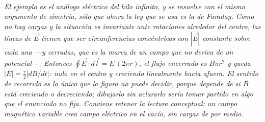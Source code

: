 \begin{center}
\begin{tikzpicture}[scale=1]
\end{tikzpicture}\\[0.5em]
{\small\itshape El ejemplo es el análogo eléctrico del hilo infinito, y se
resuelve con el mismo argumento de simetría, sólo que ahora la ley que se usa
es la de Faraday. Como no hay cargas y la situación es invariante ante
rotaciones alrededor del centro, las líneas de $\vec E$ tienen que ser
circunferencias concéntricas con $|\vec E|$ constante sobre cada una ---y
cerradas, que es la marca de un campo que no deriva de un potencial---. Entonces
$\oint \vec E\cdot d\vec l = E\,(2\pi r)$, el flujo encerrado es $B\pi r^2$ y
queda $|E| = \tfrac{r}{2}|dB/dt|$: nulo en el centro y creciendo linealmente
hacia afuera. El sentido de recorrido es lo único que la figura no puede
decidir, porque depende de si $B$ está creciendo o decreciendo; dibujarlo sin
aclararlo sería tomar partido en algo que el enunciado no fija. Conviene retener
la lectura conceptual: un campo magnético variable \emph{crea} campo eléctrico
en el vacío, sin cargas de por medio.}
\end{center}
